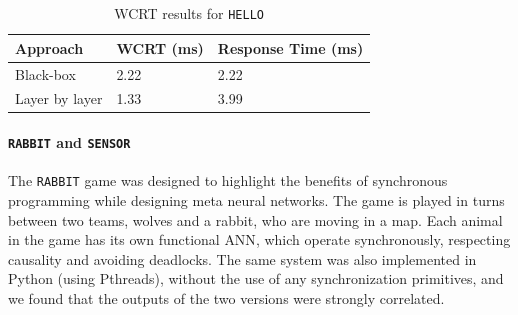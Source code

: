 \begin{table}[H]
	\centering
	\caption{\ac{WCRT} results for \texttt{HELLO}}
	\label{tbl:res-hello}
	\begin{tabular}{|l|l|l|}
		\hline
		Approach         & WCRT (ms) & Response Time (ms)\\ \hline
		Black-box        & 2.22  & 2.22  \\ 
		Layer by layer   & 1.33  & 3.99  \\ \hline
	\end{tabular}
\end{table}


\paragraph{\texttt{RABBIT} and \texttt{SENSOR}}




The \texttt{RABBIT} game was designed to highlight the benefits of synchronous
programming while designing meta neural networks. 
The game is played in turns between two teams, wolves and a rabbit, who
are moving in a map.
Each animal in the game has its own functional \ac{ANN}, which operate synchronously, respecting causality and avoiding deadlocks. 
The same system was also implemented in Python (using
Pthreads), without the use of any synchronization primitives, and we found
that the %
outputs of the two versions were
strongly correlated. %

